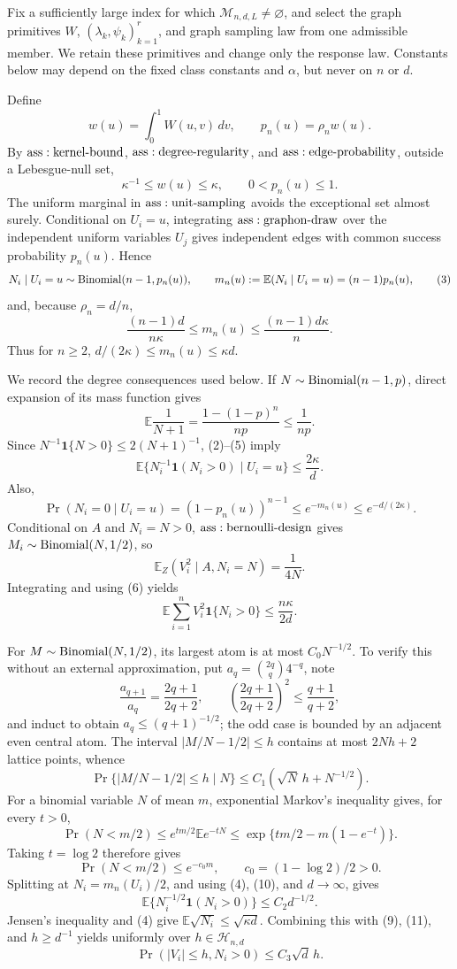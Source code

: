 Fix a sufficiently large index for which \(\mathcal M_{n,d,L}\ne\varnothing\), and select the graph primitives \(W\), \((\lambda_k,\psi_k)_{k=1}^r\), and graph sampling law from one admissible member.  We retain these primitives and change only the response law.  Constants below may depend on the fixed class constants and \(\alpha\), but never on \(n\) or \(d\).

Define
\[
 w(u)=\int_0^1W(u,v)\,dv,
 \qquad p_n(u)=\rho_nw(u).
\tag{1}
\]
By \({\rm ass:kernel\text{-}bound}\), \({\rm ass:degree\text{-}regularity}\), and \({\rm ass:edge\text{-}probability}\), outside a Lebesgue-null set,
\[
 \kappa^{-1}\leq w(u)\leq\kappa,
 \qquad 0<p_n(u)\leq1.
\tag{2}
\]
The uniform marginal in \({\rm ass:unit\text{-}sampling}\) avoids the exceptional set almost surely.  Conditional on \(U_i=u\), integrating \({\rm ass:graphon\text{-}draw}\) over the independent uniform variables \(U_j\) gives independent edges with common success probability \(p_n(u)\).  Hence
\[
 N_i\mid U_i=u\sim{\rm Binomial}(n-1,p_n(u)),
 \qquad m_n(u):=\mathbb E(N_i\mid U_i=u)=(n-1)p_n(u),
\tag{3}
\]
and, because \(\rho_n=d/n\),
\[
 \frac{(n-1)d}{n\kappa}\leq m_n(u)\leq\frac{(n-1)d\kappa}{n}.
\tag{4}
\]
Thus for \(n\geq2\), \(d/(2\kappa)\leq m_n(u)\leq\kappa d\).

We record the degree consequences used below.  If \(N\sim{\rm Binomial}(n-1,p)\), direct expansion of its mass function gives
\[
 \mathbb E\frac1{N+1}=\frac{1-(1-p)^n}{np}\leq\frac1{np}.
\tag{5}
\]
Since \(N^{-1}\mathbf1\{N>0\}\leq2(N+1)^{-1}\), (2)--(5) imply
\[
 \mathbb E\{N_i^{-1}\mathbf1(N_i>0)\mid U_i=u\}\leq\frac{2\kappa}{d}.
\tag{6}
\]
Also,
\[
 \Pr(N_i=0\mid U_i=u)=(1-p_n(u))^{n-1}
 \leq e^{-m_n(u)}\leq e^{-d/(2\kappa)}.
\tag{7}
\]
Conditional on \(A\) and \(N_i=N>0\), \({\rm ass:bernoulli\text{-}design}\) gives \(M_i\sim{\rm Binomial}(N,1/2)\), so
\[
 \mathbb E_Z(V_i^2\mid A,N_i=N)=\frac1{4N}.
\]
Integrating and using (6) yields
\[
 \mathbb E\sum_{i=1}^nV_i^2\mathbf1\{N_i>0\}\leq\frac{n\kappa}{2d}.
\tag{8}
\]

For \(M\sim{\rm Binomial}(N,1/2)\), its largest atom is at most \(C_0N^{-1/2}\).  To verify this without an external approximation, put \(a_q={2q\choose q}4^{-q}\), note
\[
 \frac{a_{q+1}}{a_q}=\frac{2q+1}{2q+2},
 \qquad \left(\frac{2q+1}{2q+2}\right)^2\leq\frac{q+1}{q+2},
\]
and induct to obtain \(a_q\leq(q+1)^{-1/2}\); the odd case is bounded by an adjacent even central atom.  The interval \(|M/N-1/2|\leq h\) contains at most \(2Nh+2\) lattice points, whence
\[
 \Pr\{|M/N-1/2|\leq h\mid N\}
 \leq C_1(\sqrt N\,h+N^{-1/2}).
\tag{9}
\]
For a binomial variable \(N\) of mean \(m\), exponential Markov's inequality gives, for every \(t>0\),
\[
 \Pr(N<m/2)
 \leq e^{tm/2}\mathbb E e^{-tN}
 \leq\exp\{tm/2-m(1-e^{-t})\}.
\]
Taking \(t=\log2\) therefore gives
\[
 \Pr(N<m/2)\leq e^{-c_0m},
 \qquad c_0=(1-\log2)/2>0.
\tag{10}
\]
Splitting at \(N_i=m_n(U_i)/2\), and using (4), (10), and \(d\to\infty\), gives
\[
 \mathbb E\{N_i^{-1/2}\mathbf1(N_i>0)\}\leq C_2d^{-1/2}.
\tag{11}
\]
Jensen's inequality and (4) give \(\mathbb E\sqrt{N_i}\leq\sqrt{\kappa d}\).  Combining this with (9), (11), and \(h\geq d^{-1}\) yields uniformly over \(h\in\mathcal H_{n,d}\)
\[
 \Pr(|V_i|\leq h,N_i>0)\leq C_3\sqrt d\,h.
\tag{12}
\]

